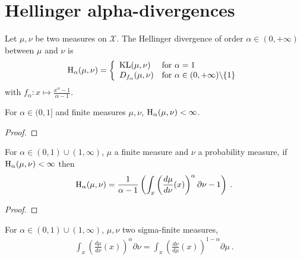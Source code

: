 \chapter{Hellinger alpha-divergences}

\begin{definition}
  \label{def:hellingerAlpha}
  \leanok
  Let $\mu, \nu$ be two measures on $\mathcal X$. The Hellinger divergence of order $\alpha \in (0,+\infty)$ between $\mu$ and $\nu$ is
  \begin{align*}
  \operatorname{H}_\alpha(\mu, \nu) = \left\{
  \begin{array}{ll}
    \operatorname{KL}(\mu, \nu) & \text{for } \alpha = 1
    \\
    D_{f_\alpha}(\mu, \nu) & \text{for } \alpha \in (0,+\infty) \backslash \{1\}
  \end{array}\right.
  \end{align*}
  with $f_\alpha : x \mapsto \frac{x^{\alpha} - 1}{\alpha - 1}$.
\end{definition}

\begin{lemma}
  \label{lem:hellingerAlpha_ne_top_of_lt_one}
  \leanok
  For $\alpha \in (0, 1]$ and finite measures $\mu, \nu$, $\operatorname{H}_\alpha(\mu, \nu) < \infty$.
\end{lemma}

\begin{proof}\leanok
\uses{}
\end{proof}

\begin{lemma}
  \label{lem:hellingerAlpha_eq_integral}
  \leanok
  For $\alpha \in (0,1)\cup(1, \infty)$, $\mu$ a finite measure and $\nu$ a probability measure, if $\operatorname{H}_\alpha(\mu, \nu) < \infty$ then
  \begin{align*}
  \operatorname{H}_\alpha(\mu, \nu) = \frac{1}{\alpha - 1} \left( \int_x \left(\frac{d \mu}{d \nu}(x)\right)^\alpha \partial \nu - 1 \right)
  \: .
  \end{align*}
\end{lemma}

\begin{proof}\leanok
\uses{}
\end{proof}

\begin{lemma}
  \label{lem:integral_rpow_rnDeriv}
  \leanok
  \uses{}
  For $\alpha \in (0,1)\cup(1, \infty)$, $\mu, \nu$ two sigma-finite measures,
  \begin{align*}
  \int_x \left(\frac{d \mu}{d \nu}(x)\right)^\alpha \partial \nu
  = \int_x \left(\frac{d \nu}{d \mu}(x)\right)^{1 - \alpha} \partial \mu
  \: .
  \end{align*}
\end{lemma}


